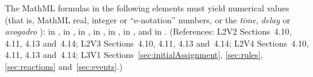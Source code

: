 The MathML formulas in the following elements must yield numerical
values (that is, MathML real, integer or ``e-notation'' numbers,
or the \emph{time}, \emph{delay} or \emph{avogadro} ):
 in \KineticLaw,  in
\InitialAssignment,  in \AssignmentRule,  in
\RateRule,  in \AlgebraicRule,  in \Event
\Delay, and  in \EventAssignment.  (References: L2V2
Sections~4.10, 4.11, 4.13 and~4.14; L2V3 Sections~4.10, 4.11, 4.13 
and~4.14; L2V4 Sections~4.10, 4.11, 4.13 and~4.14; L3V1 
Sections~\ref{sec:initialAssignment}, \ref{sec:rules}, 
\ref{sec:reactions} and~\ref{sec:events}.)


